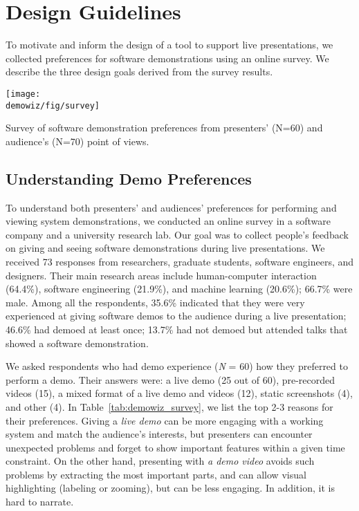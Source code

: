 \section{Design Guidelines}

To motivate and inform the design of a tool to support live presentations, we collected preferences for software demonstrations using an online survey. We describe the three design goals derived from the survey results.

\begin{table}[b!]
  \centering
  \texttt{[image: \\demowiz/fig/survey]}
  \caption{Survey of software demonstration preferences from presenters' (N=60) and audience's (N=70) point of views.}
  \label{tab:demowiz_survey}
\end{table}

\subsection{Understanding Demo Preferences} To understand both presenters' and audiences' preferences for performing and viewing system demonstrations, we conducted an online survey in a software company and a university research lab. Our goal was to collect people's feedback on giving and seeing software demonstrations during live presentations. We received 73 responses from researchers, graduate students, software engineers, and designers. Their main research areas include human-computer interaction (64.4\%), software engineering (21.9\%), and machine learning (20.6\%); 66.7\% were male. Among all the respondents, 35.6\% indicated that they were very experienced at giving software demos to the audience during a live presentation; 46.6\% had demoed at least once; 13.7\% had not demoed but attended talks that showed a software demonstration.

We asked respondents who had demo experience (\textit{N} = 60) how they preferred to perform a demo. Their answers were: a live demo (25 out of 60), pre-recorded videos (15), a mixed format of a live demo and videos (12), static screenshots (4), and other (4). In Table~\ref{tab:demowiz_survey}, we list the top 2-3 reasons for their preferences. Giving a \textit{live demo} can be more engaging with a working system and match the audience's interests, but presenters can encounter unexpected problems and forget to show important features within a given time constraint. On the other hand, presenting with \textit{a demo video} avoids such problems by extracting the most important parts, and can allow visual highlighting (labeling or zooming), but can be less engaging. In addition, it is hard to narrate.

